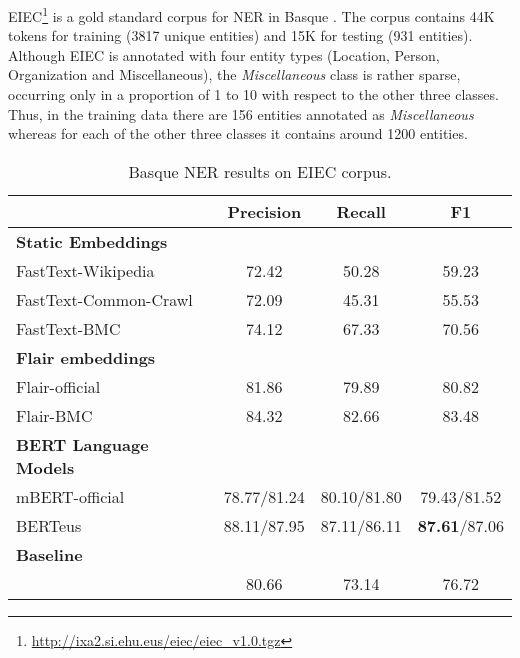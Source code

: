 \documentclass[10pt, a4paper]{article}
\begin{document}
EIEC\footnote{\scriptsize{\url{http://ixa2.si.ehu.eus/eiec/eiec_v1.0.tgz}}} is a gold standard corpus for NER in Basque \cite{alegria2006lessons}. The corpus contains 44K tokens for training (3817 unique entities) and 15K for testing (931 entities). Although EIEC is annotated with four entity types (Location, Person, Organization and Miscellaneous), the \emph{Miscellaneous} class is rather sparse, occurring only in a proportion of 1 to 10 with respect to the other three classes. Thus, in the training data there are 156 entities annotated as \emph{Miscellaneous} whereas for each of the other three classes it contains around 1200 entities.
\begin{table}[!ht]\footnotesize
\centering
\begin{tabular}{@{\hspace{0.3cm}}lccc} \hline
 \textbf{} &\textbf{Precision} & \textbf{Recall} & \textbf{F1} \\ \hline
\textbf{Static Embeddings} & & &  \\
FastText-Wikipedia & 72.42 & 50.28 & 59.23 \\
FastText-Common-Crawl & 72.09 & 45.31 & 55.53 \\
FastText-BMC  & 74.12 & 67.33 & 70.56 \\
\hline%
\textbf{Flair embeddings}\\
Flair-official & 81.86 & 79.89 & 80.82 \\
Flair-BMC & 84.32 & 82.66 & 83.48 \\ \hline
\textbf{BERT Language Models} \\
mBERT-official  & 78.77/81.24 & 80.10/81.80 & 79.43/81.52 \\
BERTeus  & 88.11/87.95 & 87.11/86.11 & \textbf{87.61}/87.06 \\ \hline
\textbf{Baseline} \\
\cite{agerri2016robust} & 80.66 & 73.14 & 76.72 \\ \hline
\end{tabular}
\caption{Basque NER results on EIEC corpus.}\label{tab:ner}
\end{table}
\end{document}
